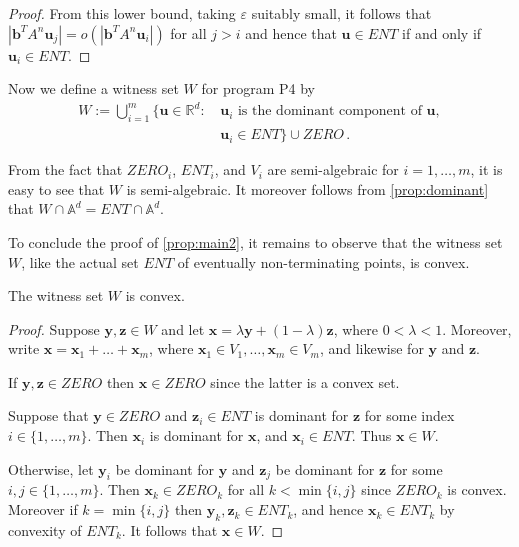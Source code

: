 \begin{proof}
From this lower bound, taking $\varepsilon$ suitably small, it follows
that $|\boldsymbol{b}^TA^n\boldsymbol{u}_j|=o(|\boldsymbol{b}^TA^n
\boldsymbol{u}_i|)$ for all $j>i$ and hence that
$\boldsymbol{u}\in\mathit{ENT}$ if and only if $\boldsymbol{u}_i\in
\mathit{ENT}$.
\end{proof}

Now we define a witness set $W$ for program \textsf{P4} by
\begin{align*}
W :=   \bigcup_{i=1}^m \{\boldsymbol{u}\in \mathbb{R}^d: \,
         & \boldsymbol{u}_i \mbox{ is the dominant component of } \boldsymbol{u},\\
         & \boldsymbol{u}_i \in \mathit{ENT} \}
\cup \mathit{ZERO} \, .
\end{align*}

From the fact that $\mathit{ZERO}_i$, $\mathit{ENT}_i$, and $V_i$ are
semi-algebraic for $i=1,\ldots,m$, it is easy to see that $W$ is
semi-algebraic.  It moreover follows from \cref{prop:dominant}
that $W \cap \mathbb{A}^d = \mathit{ENT} \cap \mathbb{A}^d$.

To conclude the proof of \cref{prop:main2}, it
remains to observe that the witness set $W$, like the actual set
$\mathit{ENT}$ of eventually non-terminating points, is convex.
\begin{proposition}
The witness set $W$ is convex.
\end{proposition}
\begin{proof}
  Suppose $\boldsymbol y,\boldsymbol z\in W$ and let $\boldsymbol
  x=\lambda\boldsymbol y+(1-\lambda)\boldsymbol z$, where $0 < \lambda
  < 1$. Moreover, write
  $\boldsymbol{x}=\boldsymbol{x}_1+\ldots+\boldsymbol{x}_m$, where
  $\boldsymbol{x}_1\in V_1,\ldots,\boldsymbol{x}_m\in V_m$, and
  likewise for $\boldsymbol{y}$ and $\boldsymbol{z}$.

If $\boldsymbol{y},\boldsymbol{z}\in \mathit{ZERO}$ then
$\boldsymbol{x}\in \mathit{ZERO}$ since the latter is a convex set.

Suppose that $\boldsymbol{y}\in \mathit{ZERO}$ and $\boldsymbol{z}_i \in \mathit{ENT}$ is dominant for $\boldsymbol{z}$ for some index $i\in\{1,\ldots,m\}$.
Then $\boldsymbol{x}_i$ is dominant for $\boldsymbol{x}$, and
$\boldsymbol{x}_i \in \mathit{ENT}$.  Thus $\boldsymbol{x}\in W$.

Otherwise, let $\boldsymbol y_i$ be dominant for $\boldsymbol y$ and
$\boldsymbol z_j$ be dominant for $\boldsymbol z$ for some
$i,j\in\{1,\ldots,m\}$.  Then $\boldsymbol x_k\in \mathit{ZERO}_k$ for
all $k<\min\lbrace i,j\rbrace$ since $\mathit{ZERO}_k$ is convex.
Moreover if $k=\min\lbrace i,j\rbrace$ then $\boldsymbol
y_k,\boldsymbol z_k \in \mathit{ENT}_k$, and hence $\boldsymbol x_k
\in \mathit{ENT}_k$ by convexity of $\mathit{ENT}_k$.  It follows that
$\boldsymbol{x}\in W$.
\end{proof}

